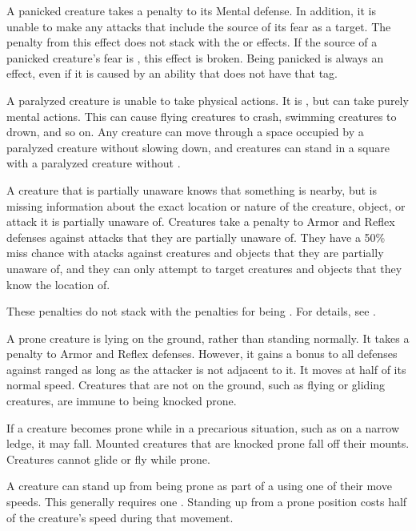    A panicked creature takes a  penalty to its Mental defense.
  In addition, it is unable to make any attacks that include the source of its fear as a target.
  The penalty from this effect does not stack with the \frightened or \panicked effects.
  If the source of a panicked creature's fear is , this effect is broken.
  Being panicked is always an  effect, even if it is caused by an ability that does not have that tag.

   A paralyzed creature is unable to take physical actions. It is \helpless, but can take purely mental actions. This can cause flying creatures to crash, swimming creatures to drown, and so on. Any creature can move through a space occupied by a paralyzed creature without slowing down, and creatures can stand in a square with a paralyzed creature without \squeezing.

   A creature that is partially unaware knows that something is nearby, but is missing information about the exact location or nature of the creature, object, or attack it is partially unaware of.
  Creatures take a  penalty to Armor and Reflex defenses against attacks that they are partially unaware of.
  They have a 50\% miss chance with  atacks against creatures and objects that they are partially unaware of, and they can only attempt to target creatures and objects that they know the location of.

  These penalties do not stack with the penalties for being \unaware.
  For details, see .

   A prone creature is lying on the ground, rather than standing normally.
  It takes a  penalty to Armor and Reflex defenses.
  However, it gains a  bonus to all defenses against ranged  as long as the attacker is not adjacent to it.
  It moves at half of its normal speed.
  Creatures that are not on the ground, such as flying or gliding creatures, are immune to being knocked prone.

  If a creature becomes prone while in a precarious situation, such as on a narrow ledge, it may fall.
  Mounted creatures that are knocked prone fall off their mounts.
  Creatures cannot glide or fly while prone.

  A creature can stand up from being prone as part of a  using one of their move speeds.
  This generally requires one .
  Standing up from a prone position costs half of the creature's speed during that movement.

